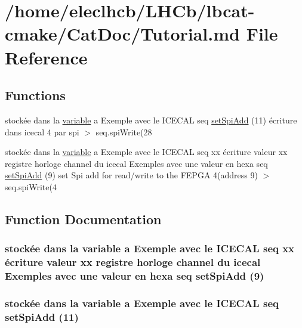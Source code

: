 \hypertarget{Tutorial_8md}{
\section{/home/eleclhcb/LHCb/lbcat-\/cmake/CatDoc/Tutorial.md File Reference}
\label{Tutorial_8md}
}
\subsection*{Functions}
\begin{DoxyCompactItemize}
\item 
stockée dans la \hyperlink{README_8md_aa9be1efea44c73a389d100be792af698}{variable} a Exemple avec le ICECAL seq \hyperlink{Tutorial_8md_ade6c966b8d47e207cc655dc4d8344b9b}{setSpiAdd} (11) écriture dans icecal 4 par spi $>$ seq.spiWrite(28
\item 
stockée dans la \hyperlink{README_8md_aa9be1efea44c73a389d100be792af698}{variable} a Exemple avec le ICECAL seq xx écriture valeur xx registre horloge channel du icecal Exemples avec une valeur en hexa seq \hyperlink{Tutorial_8md_a8794fafd1bd1a119b6fdf84b429a9ad6}{setSpiAdd} (9) set Spi add for read/write to the FEPGA 4(address 9) $>$ seq.spiWrite(4
\end{DoxyCompactItemize}


\subsection{Function Documentation}
\hypertarget{Tutorial_8md_a8794fafd1bd1a119b6fdf84b429a9ad6}{
\subsubsection[{setSpiAdd}]{\setlength{\rightskip}{0pt plus 5cm}stockée dans la {\bf variable} a Exemple avec le ICECAL seq xx écriture valeur xx registre horloge channel du icecal Exemples avec une valeur en hexa seq setSpiAdd (9)}}
\label{Tutorial_8md_a8794fafd1bd1a119b6fdf84b429a9ad6}
\hypertarget{Tutorial_8md_ade6c966b8d47e207cc655dc4d8344b9b}{
\subsubsection[{setSpiAdd}]{\setlength{\rightskip}{0pt plus 5cm}stockée dans la {\bf variable} a Exemple avec le ICECAL seq setSpiAdd (11)}}
\label{Tutorial_8md_ade6c966b8d47e207cc655dc4d8344b9b}
